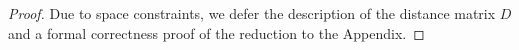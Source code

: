 \documentclass[a4paper,UKenglish,cleveref, autoref, thm-restate,anonymous]{lipics-v2021}
\newcommand{\deltaExactLong}{\textsc{Simple periodic Temporal Graph Realization}}
\begin{document}
\begin{proof}
\begin{comment}
Let $y^i$ belong to the verification gadget of color $i$ and let $w'\in \hat{W}$ denote the neighbor of $y^i$ in the alignment gadget. Let $\hat{v}_1$ and $\hat{v}_2$ belong to the connector gadget of the verification gadget for color $i$. Let $\hat{V}$ contain all vertices $\hat{v}_1$ and $\hat{v}_2$ belonging to the other connector gadgets (different from the one of the verification gadget for color $i$). Let $V_i$ denote the set of all vertices of the verification gadget of color $i$.
\begin{itemize}
    \item We set $d(w^\star,y^i)=n^8-1$, $d(w',v^i_0)=2$, and $d(w^\star,v^i_0)=n^8$.
    \item We set $d(w^\star,\hat{v}_1)=n^9$, $d(w^\star,\hat{v}_2)=n^9$, $d(w',\hat{v}_1)=n^9-n^8$, and $d(w',\hat{v}_2)=n^9-n^8$.
    \item For each vertex $v\in (V^\star\cup \hat{V})\setminus V_i$ we set $d(w^\star,v)=n^9+1$, $d(w,v)=n^9-n^8+2$, and $d(y^i,v)=n^9-n^8+2$.
\end{itemize}
Let $\hat{v}_1$ belong to some connector gadget. Then we set $d(w^\star,\hat{v}_1)=n^9$.

All fastest path durations between non-adjacent vertex pairs that are not specified above are set to infinity.

\end{comment}


Due to space constraints, we defer the description of the distance matrix $D$ and a formal correctness proof of the reduction to the Appendix.


\end{proof}
\end{document}
